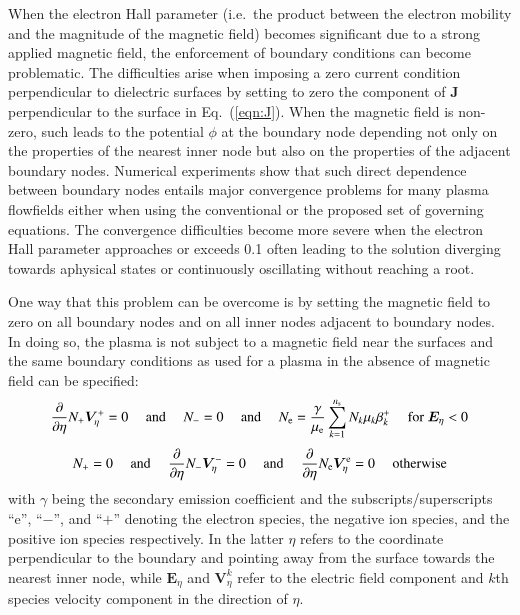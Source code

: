 \documentclass{warpdoc}
\newcommand{\ns}{{n_{\rm s}}}
\renewcommand{\vec}[1]{\bm{#1}}
\begin{document}
When the electron Hall parameter (i.e.\ the product between the electron mobility and the magnitude of the magnetic field) becomes significant due to a strong applied magnetic field, the enforcement of boundary conditions can become problematic. The difficulties arise when imposing a zero current condition perpendicular to dielectric surfaces by setting to zero the component of $\vec{J}$ perpendicular to the surface in Eq.\ (\ref{eqn:J}). When the magnetic field is non-zero, such leads to the potential $\phi$ at the boundary node depending not only on the properties of the nearest inner node but also on the properties of the adjacent boundary nodes. Numerical experiments show that such direct dependence between boundary nodes entails major convergence problems for many plasma flowfields either when using the conventional or the proposed set of governing equations. The convergence difficulties become more severe when the electron Hall parameter approaches or exceeds 0.1 often leading to the solution diverging towards aphysical states or continuously oscillating without reaching a root. 

One way that this problem can be overcome is by setting the magnetic field to zero on all boundary nodes and on all inner nodes adjacent to boundary nodes. In doing so, the plasma is not subject to a magnetic field near the surfaces and the same boundary conditions as used for a plasma in the absence of magnetic field can be specified:
%
\begin{equation}
\frac{\partial }{\partial \eta} N_+ \vec{V}^{+}_\eta = 0
{~~~~~\rm and~~~~~}
N_{-}=0
{~~~~~\rm and~~~~~}
N_{\rm e}=\frac{\gamma}{\mu_{\rm e}} \sum_{k=1}^\ns N_k \mu_k \beta_k^+
{~~~~~\rm for~}
\vec{E}_\eta<0
\end{equation}
%
%
\begin{equation}
N_{+}=0
{~~~~~\rm and~~~~~}
\frac{\partial }{\partial \eta} N_- \vec{V}^{-}_\eta = 0
{~~~~~\rm and~~~~~}
\frac{\partial }{\partial \eta} N_{\rm e} \vec{V}^{\rm e}_\eta= 0
{~~~~~\rm otherwise} 
\end{equation}
%
with $\gamma$ being the secondary emission coefficient and the subscripts/superscripts ``e'', ``$-$'', and ``$+$'' denoting the electron species, the negative ion species, and the positive ion species respectively. In the latter $\eta$ refers to the coordinate perpendicular to the boundary and pointing away from the surface towards the nearest inner node, while  $\vec{E}_\eta$ and $\vec{V}^k_\eta$ refer to the electric field component and $k$th species velocity component in the direction of $\eta$.   
\end{document}

